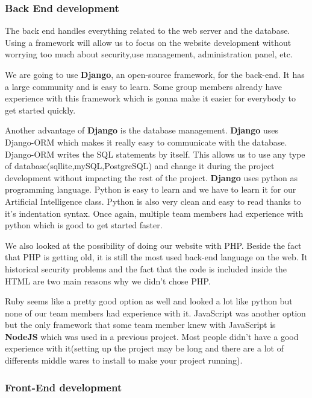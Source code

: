 \subsubsection{Back End development}
The back end handles everything related to the web server and the database. Using a framework will allow us to focus on the website development without worrying too much about security,use management, administration panel, etc.\newline

We are going to use \textbf{Django}, an open-source framework, for the back-end. It has a large community and is easy to learn. Some group members already have experience with this framework which is gonna make it easier for everybody to get started quickly.\newline

Another advantage of \textbf{Django} is the database management. \textbf{Django} uses Django-ORM which makes it really easy to communicate with the database. Django-ORM writes the SQL statements by itself. This allows us to use any type of database(sqllite,mySQL,PostgreSQL) and change it during the project development without impacting the rest of the project.
\textbf{Django} uses python as programming language. Python is easy to learn and we have to learn it for our Artificial Intelligence class.
Python is also very clean and easy to read thanks to it's indentation syntax. Once again, multiple team members had experience with python which is good to get started faster.\newline

We also looked at the possibility of doing our website with PHP. Beside the fact that PHP is getting old, it is still the most used back-end language on the web. It historical security problems and the fact that the code is included inside the HTML are two main reasons why we didn't chose PHP.\newline

Ruby seems like a pretty good option as well and looked a lot like python but none of our team members had experience with it. JavaScript was another option but the only framework that some team member knew with JavaScript is \textbf{NodeJS} which was used in a previous project. Most people didn't have a good experience with it(setting up the project may be long and there are a lot of differents middle wares to install to make your project running).

\subsubsection{Front-End development}

